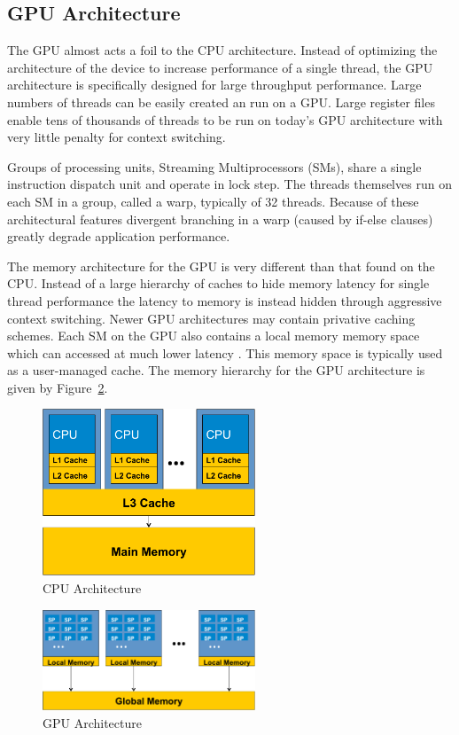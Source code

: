 \documentclass[journal]{IEEEtran}
\begin{document}
\subsection{GPU Architecture}
The GPU almost acts a foil to the CPU architecture.  Instead of optimizing the
architecture of the device to increase performance of a single thread, the GPU
architecture is specifically designed for large throughput performance.  Large
numbers of threads can be easily created an run on a GPU.  Large register files
enable tens of thousands of threads to be run on today's GPU architecture with
very little penalty for context switching.

Groups of processing units, Streaming Multiprocessors (SMs), share a single instruction
dispatch unit and operate in lock step.  The threads themselves run on each SM
in a group, called a warp, typically of 32 threads.  Because of these architectural
features divergent branching in a warp (caused by if-else clauses) greatly degrade application
performance.

The memory architecture for the GPU is very different than that found on the CPU. 
Instead of a large hierarchy of caches to hide memory latency for single thread
performance the latency to memory is instead hidden through aggressive context
switching.  Newer GPU architectures may contain privative caching schemes.
Each SM on the GPU also contains a local memory memory space which can accessed 
at much lower latency .  This memory space is typically used as a user-managed
cache. The memory hierarchy for the GPU architecture is given by Figure~\ref{fig:gpu_arch}.

\begin{figure}[t]
\centering
\includegraphics[width=2.5in]{cpu_architecture}
\caption{CPU Architecture}
\label{fig:cpu_arch}
\end{figure}

\begin{figure}[t]
\centering
\includegraphics[width=2.5in]{gpu_architecture}
\caption{GPU Architecture}
\label{fig:gpu_arch}
\end{figure}
\end{document}
